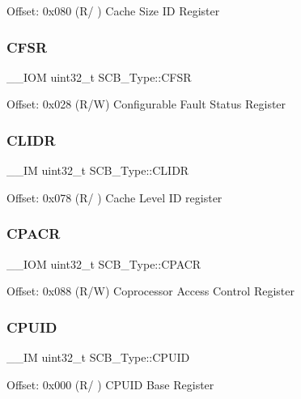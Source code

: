 Offset\+: 0x080 (R/ ) Cache Size ID Register \mbox{\label{struct_s_c_b___type_a0cda9e061b42373383418663092ad19a}} 
\subsubsection{\texorpdfstring{CFSR}{CFSR}}
{\footnotesize\ttfamily \+\_\+\+\_\+\+I\+OM uint32\+\_\+t S\+C\+B\+\_\+\+Type\+::\+C\+F\+SR}

Offset\+: 0x028 (R/W) Configurable Fault Status Register \mbox{\label{struct_s_c_b___type_ad9899f5775251cf5ef0cb0845527afc2}} 
\subsubsection{\texorpdfstring{CLIDR}{CLIDR}}
{\footnotesize\ttfamily \+\_\+\+\_\+\+IM uint32\+\_\+t S\+C\+B\+\_\+\+Type\+::\+C\+L\+I\+DR}

Offset\+: 0x078 (R/ ) Cache Level ID register \mbox{\label{struct_s_c_b___type_ac6a860c1b8d8154a1f00d99d23b67764}} 
\subsubsection{\texorpdfstring{CPACR}{CPACR}}
{\footnotesize\ttfamily \+\_\+\+\_\+\+I\+OM uint32\+\_\+t S\+C\+B\+\_\+\+Type\+::\+C\+P\+A\+CR}

Offset\+: 0x088 (R/W) Coprocessor Access Control Register \mbox{\label{struct_s_c_b___type_a21e08d546d8b641bee298a459ea73e46}} 
\subsubsection{\texorpdfstring{CPUID}{CPUID}}
{\footnotesize\ttfamily \+\_\+\+\_\+\+IM uint32\+\_\+t S\+C\+B\+\_\+\+Type\+::\+C\+P\+U\+ID}

Offset\+: 0x000 (R/ ) C\+P\+U\+ID Base Register \mbox{\label{struct_s_c_b___type_ad3884e8b6504ec63c1eaa8742e94df3d}} 
